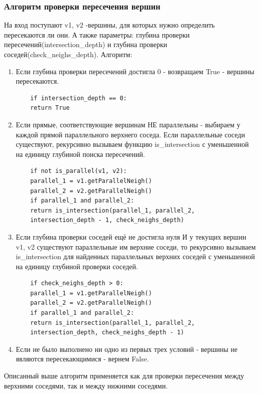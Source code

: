 \subsubsection{Алгоритм проверки пересечения вершин}
\label{intersection}
На вход поступают v1, v2 -вершины, для которых нужно определить пересекаются ли они.
А также параметры: глубина проверки пересечений(intersection\_depth) и глубина проверки соседей(check\_neighs\_depth).
\newline
Алгоритм:
\begin{enumerate}
	\item Если глубина проверки пересечений достигла 0 - возвращаем True - вершины пересекаются.
	\begin{lstlisting}
	if intersection_depth == 0:
	return True
	\end{lstlisting}
	\item Если прямые, соответствующие вершинам НЕ параллельны - выбираем у каждой прямой параллельного верхнего соседа. Если параллельные соседи существуют, рекурсивно вызываем функцию is\_intersection с уменьшенной на единицу глубиной поиска пересечений.
	\begin{lstlisting}
	if not is_parallel(v1, v2):
	parallel_1 = v1.getParallelNeigh()
	parallel_2 = v2.getParallelNeigh()
	if parallel_1 and parallel_2:
	return is_intersection(parallel_1, parallel_2,
	intersection_depth - 1, check_neighs_depth)
	\end{lstlisting}
	\item Если глубина проверки соседей ещё не достигла нуля И у текущих вершин v1, v2 существуют параллельные им верхние соседи, то рекурсивно вызываем is\_intersection для найденных параллельных верхних соседей с уменьшенной на единицу глубиной проверки соседей.
	\begin{lstlisting}
	if check_neighs_depth > 0:
	parallel_1 = v1.getParallelNeigh()
	parallel_2 = v2.getParallelNeigh()
	if parallel_1 and parallel_2:
	return is_intersection(parallel_1, parallel_2,
	intersection_depth, check_neighs_depth - 1)
	\end{lstlisting}
	\item Если не было выполнено ни одно из первых трех условий - вершины не являются пересекающимися - вернем False.
\end{enumerate}
Описанный выше алгоритм применяется как для проверки пересечения между верхними соседями, так и между нижними соседями. 

